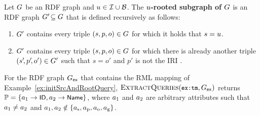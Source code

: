 \begin{algorithm}[t]

\end{algorithm}

\begin{definition}
	\label{def:rooted_subgraph}
	\normalfont
	Let $G$ be an RDF graph and
		$u \in \mathcal{I} \cup \mathcal{B}$.
	The \textbf{$u$-rooted subgraph of $G$}
	is an RDF graph $G'\! \subseteq G$
	that is defined recursively as follows:%
%
\vspace{-2mm} %
%
	\begin{enumerate}
		\item $G'$ contains every triple $(s,p,o) \in G$ for which it holds that $s = u$.
		\item $G'$ contains every triple $(s,p,o) \in G$ for which there
			is already another
		triple $(s'\!,p'\!,o') \in G'$ such that $s = o'$ and $p'$ is not the IRI .
	\end{enumerate}
\end{definition}

\vspace{-3mm} %

\begin{example}
	\label{ex:ExtractQueries}
	For the RDF graph $G_\mathsf{ex}$ that contains the RML mapping of
		Example~\ref{ex:initSrcAndRootQuery},
	$\textsc{ExtractQueries}(\texttt{\small ex:tm},G_\mathsf{ex})$ returns $\mathbb{P} = \{ a_1 \rightarrow \textsf{\small ID}, a_2 \rightarrow \textsf{\small Name} \}$,
	where $a_1$ and $a_2$ are arbitrary attributes such that $a_1 \neq a_2$ and $a_1, a_2 \notin \{ a_\textrm{s}, a_\textrm{p}, a_\textrm{o}, a_\textrm{g} \}$.
\end{example}

\enlargethispage{\baselineskip}%
\vspace{-1mm} %

